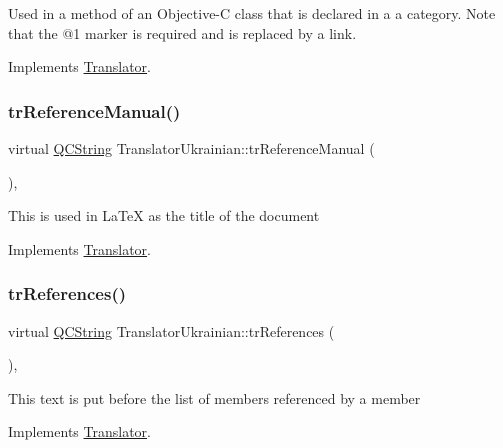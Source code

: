 Used in a method of an Objective-\/C class that is declared in a a category. Note that the @1 marker is required and is replaced by a link. 

Implements \mbox{\hyperlink{class_translator}{Translator}}.

\mbox{\label{class_translator_ukrainian_ad620894dab9040701c4937ff891bb465}} 
\subsubsection{\texorpdfstring{trReferenceManual()}{trReferenceManual()}}
{\footnotesize\ttfamily virtual \mbox{\hyperlink{class_q_c_string}{Q\+C\+String}} Translator\+Ukrainian\+::tr\+Reference\+Manual (\begin{DoxyParamCaption}{ }\end{DoxyParamCaption})\hspace{0.3cm}{\ttfamily [inline]}, {\ttfamily [virtual]}}

This is used in La\+TeX as the title of the document 

Implements \mbox{\hyperlink{class_translator}{Translator}}.

\mbox{\label{class_translator_ukrainian_acdad4cab83ea1d6aa1aa854ed08f4202}} 
\subsubsection{\texorpdfstring{trReferences()}{trReferences()}}
{\footnotesize\ttfamily virtual \mbox{\hyperlink{class_q_c_string}{Q\+C\+String}} Translator\+Ukrainian\+::tr\+References (\begin{DoxyParamCaption}{ }\end{DoxyParamCaption})\hspace{0.3cm}{\ttfamily [inline]}, {\ttfamily [virtual]}}

This text is put before the list of members referenced by a member 

Implements \mbox{\hyperlink{class_translator}{Translator}}.

\mbox{\label{class_translator_ukrainian_a1847e755dd0afdb14dedaa868a3ccf87}} 
